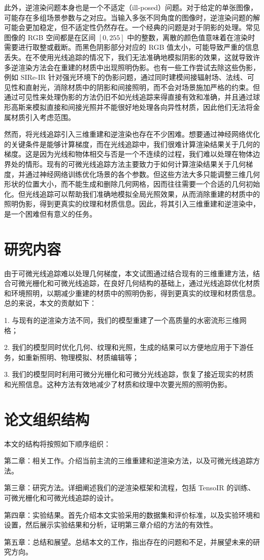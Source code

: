 此外，逆渲染问题本身也是一个不适定（ill-posed）问题。对于给定的单张图像，可能存在多组场景参数与之对应。当输入多张不同角度的图像时，逆渲染问题的解可能会更加稳定，但不适定性仍然存在。一个经典的问题是对于阴影的处理。常见图像的 RGB 空间都是在区间 $[0, 255]$ 中的整数，离散的颜色值意味着在渲染时需要进行取整或截断。而黑色阴影部分对应的 RGB 值太小，可能导致严重的信息丢失。在不使用光线追踪的情况下，我们无法准确地模拟阴影的效果，这就导致许多逆渲染方法会在重建的材质中出现照明伪影。也有一些工作尝试去除这些伪影，例如 SIRe-IR \cite{SIRe-IR} 针对强光环境下的伪影问题，通过同时建模间接辐射场、法线、可见性和直射光，消除材质中的阴影和间接照明，而不会对场景施加严格的约束。但通过可见性来处理伪影的方法仍旧不如光线追踪来得直接有效和准确，并且通过球形高斯来模拟直接和间接光照并不能很好地处理各向异性材质，因此他们无法将金属材质引入考虑范围。

然而，将光线追踪引入三维重建和逆渲染也存在不少困难。想要通过神经网络优化的关键条件是能够计算梯度，而在光线追踪中，我们很难计算渲染结果关于几何的梯度。这是因为光线和物体相交与否是一个不连续的过程，我们难以处理在物体边界处的情形。现有的可微光线追踪方法主要致力于如何计算渲染结果关于几何梯度，并通过神经网络训练优化场景的各个参数。但这些方法大多只能调整三维几何形状的位置大小，而不能生成和删除几何网格，因而往往需要一个合适的几何初始化。但光线追踪可以帮助我们准确地模拟全局光照效果，从而消除重建的材质中的照明伪影，得到更真实的纹理和材质信息。因此，将其引入三维重建和逆渲染中，是一个困难但有意义的任务。

\section{研究内容}

由于可微光线追踪难以处理几何梯度，本文试图通过结合现有的三维重建方法，结合可微光栅化和可微光线追踪，在良好几何结构的基础上，通过光线追踪优化材质和环境照明，以期减少重建的材质中的照明伪影，得到更真实的纹理和材质信息。总的来说，本文的贡献如下：

1. 与现有的逆渲染方法不同，我们的模型重建了一个高质量的水密流形三维网格；

2. 我们的模型同时优化几何、纹理和光照，生成的结果可以方便地应用于下游任务，如重新照明、物理模拟、材质编辑等；

3. 我们的模型同时利用可微分光栅化和可微分光线追踪，恢复了接近现实的材质和光照信息。这种方法有效地减少了材质和纹理中次要光照的照明伪影。

\section{论文组织结构}

本文的结构将按照如下顺序组织：

第二章：相关工作。介绍当前主流的三维重建和逆渲染方法，以及可微光线追踪方法。

第三章：研究方法。详细阐述我们的逆渲染框架和流程，包括 TensoIR 的训练、可微光栅化和可微光线追踪的设计。

第四章：实验结果。首先介绍本文实验采用的数据集和评价标准，以及实验环境和设置，然后展示实验结果和分析，证明第三章介绍的方法的有效性。

第五章：总结和展望。总结本文的工作，指出存在的问题和不足，并展望未来的研究方向。

